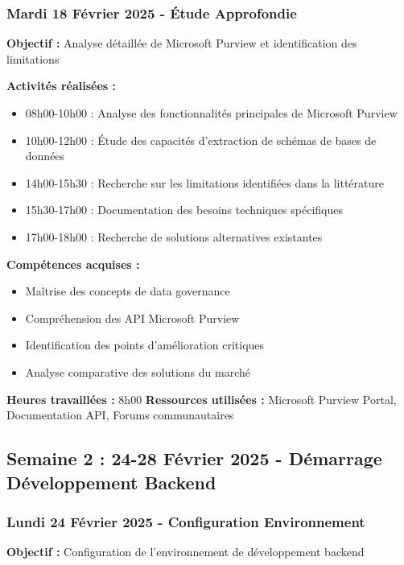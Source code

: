 \documentclass[12pt,a4paper]{article}
\begin{document}
\subsubsection{Mardi 18 Février 2025 - Étude Approfondie}
\textbf{Objectif :} Analyse détaillée de Microsoft Purview et identification des limitations

\textbf{Activités réalisées :}
\begin{itemize}
    \item 08h00-10h00 : Analyse des fonctionnalités principales de Microsoft Purview
    \item 10h00-12h00 : Étude des capacités d'extraction de schémas de bases de données
    \item 14h00-15h30 : Recherche sur les limitations identifiées dans la littérature
    \item 15h30-17h00 : Documentation des besoins techniques spécifiques
    \item 17h00-18h00 : Recherche de solutions alternatives existantes
\end{itemize}

\textbf{Compétences acquises :}
\begin{itemize}
    \item Maîtrise des concepts de data governance
    \item Compréhension des API Microsoft Purview
    \item Identification des points d'amélioration critiques
    \item Analyse comparative des solutions du marché
\end{itemize}

\textbf{Heures travaillées :} 8h00
\textbf{Ressources utilisées :} Microsoft Purview Portal, Documentation API, Forums communautaires


\subsection{Semaine 2 : 24-28 Février 2025 - Démarrage Développement Backend}

\subsubsection{Lundi 24 Février 2025 - Configuration Environnement}
\textbf{Objectif :} Configuration de l'environnement de développement backend
\end{document}
